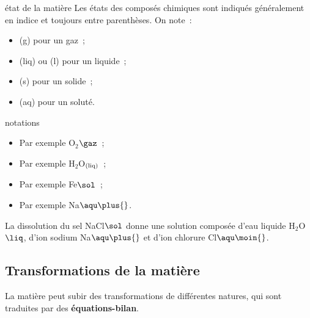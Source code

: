 \documentclass[../main/main.tex]{subfiles}
\begin{document}
\begin{tcbraster}[raster columns=2, raster equal height=rows]
    \begin{nota}[label=nota:état]{état de la matière}
        Les états des composés chimiques sont indiqués généralement en indice et
        toujours entre parenthèses. On note~:
        \begin{itemize}
            \item (g) pour un gaz~;
            \item (liq) ou (l) pour un liquide~;
            \item (s) pour un solide~;
            \item (aq) pour un soluté.
        \end{itemize}
    \end{nota}
    \begin{exem}[label=exem:notationétat]{notations}
        \begin{itemize}
            \item Par exemple O$_{2}$$\gaz$~;
            \item Par exemple H$_2$O$_{\rm (liq)}$~;
            \item Par exemple Fe$\sol$~;
            \item Par exemple Na$\aqu\plus{}$.
        \end{itemize}
        La dissolution du sel NaCl$\sol$ donne une solution composée  d'eau liquide
        H$_2$O$\liq$, d'ion sodium Na$\aqu\plus{}$ et d'ion chlorure
        Cl$\aqu\moin{}$.
    \end{exem}
\end{tcbraster}

% 

\subsection{Transformations de la matière}

La matière peut subir des transformations de différentes natures, qui sont
traduites par des \textbf{équations-bilan}.
\end{document}
